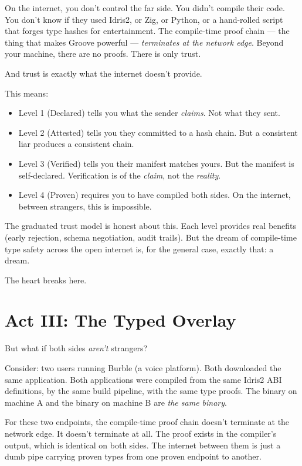 \documentclass[11pt,a4paper]{article}
\begin{document}
On the internet, you don't control the far side. You didn't compile
their code. You don't know if they used Idris2, or Zig, or Python, or a
hand-rolled script that forges type hashes for entertainment. The
compile-time proof chain --- the thing that makes Groove powerful ---
\emph{terminates at the network edge}. Beyond your machine, there are no
proofs. There is only trust.

And trust is exactly what the internet doesn't provide.

This means:
\begin{itemize}
\item Level 1 (Declared) tells you what the sender \emph{claims}. Not
  what they sent.
\item Level 2 (Attested) tells you they committed to a hash chain. But a
  consistent liar produces a consistent chain.
\item Level 3 (Verified) tells you their manifest matches yours. But the
  manifest is self-declared. Verification is of the \emph{claim}, not
  the \emph{reality}.
\item Level 4 (Proven) requires you to have compiled both sides. On the
  internet, between strangers, this is impossible.
\end{itemize}

The graduated trust model is honest about this. Each level provides real
benefits (early rejection, schema negotiation, audit trails). But the
dream of compile-time type safety across the open internet is, for the
general case, exactly that: a dream.

The heart breaks here.

\section{Act III: The Typed Overlay}

But what if both sides \emph{aren't} strangers?

Consider: two users running Burble (a voice platform). Both downloaded
the same application. Both applications were compiled from the same
Idris2 ABI definitions, by the same build pipeline, with the same type
proofs. The binary on machine A and the binary on machine B are
\emph{the same binary}.

For these two endpoints, the compile-time proof chain doesn't terminate
at the network edge. It doesn't terminate at all. The proof exists in
the compiler's output, which is identical on both sides. The internet
between them is just a dumb pipe carrying proven types from one proven
endpoint to another.
\end{document}
